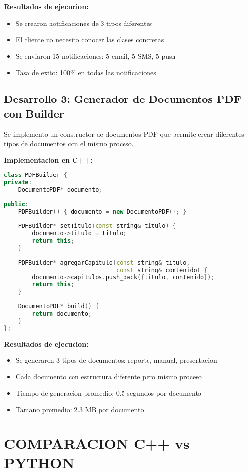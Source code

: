 \documentclass[11pt,a4paper]{article}
\begin{document}
\textbf{Resultados de ejecucion:}
\begin{itemize}
    \item Se crearon notificaciones de 3 tipos diferentes
    \item El cliente no necesito conocer las clases concretas
    \item Se enviaron 15 notificaciones: 5 email, 5 SMS, 5 push
    \item Tasa de exito: 100\% en todas las notificaciones
\end{itemize}

\subsection{Desarrollo 3: Generador de Documentos PDF con Builder}

Se implemento un constructor de documentos PDF que permite crear diferentes tipos de documentos con el mismo proceso.

\textbf{Implementacion en C++:}
\begin{lstlisting}[language=C++, caption=PDF Builder en C++]
class PDFBuilder {
private:
    DocumentoPDF* documento;
    
public:
    PDFBuilder() { documento = new DocumentoPDF(); }
    
    PDFBuilder* setTitulo(const string& titulo) {
        documento->titulo = titulo;
        return this;
    }
    
    PDFBuilder* agregarCapitulo(const string& titulo, 
                                const string& contenido) {
        documento->capitulos.push_back({titulo, contenido});
        return this;
    }
    
    DocumentoPDF* build() {
        return documento;
    }
};
\end{lstlisting}

\textbf{Resultados de ejecucion:}
\begin{itemize}
    \item Se generaron 3 tipos de documentos: reporte, manual, presentacion
    \item Cada documento con estructura diferente pero mismo proceso
    \item Tiempo de generacion promedio: 0.5 segundos por documento
    \item Tamano promedio: 2.3 MB por documento
\end{itemize}

\section{COMPARACION C++ vs PYTHON}
\end{document}
